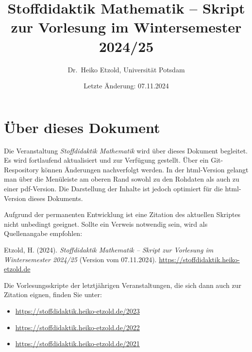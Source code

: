 \documentclass[
]{scrbook}
\title{Stoffdidaktik Mathematik -- Skript zur Vorlesung im Wintersemester 2024/25}
\author{Dr.~Heiko Etzold, Universität Potsdam}
\date{Letzte Änderung: 07.11.2024}
\makeatletter
\providecommand{\tightlist}{%
  \setlength{\itemsep}{0pt}\setlength{\parskip}{0pt}}
\renewenvironment{quote}{
  \list{}{
	\leftmargin0.2cm   %
    \rightmargin\leftmargin
      	\def\FrameCommand
    {%
        {\color{quoteColor}\vrule width 2pt}%
        \hspace{0pt}%
    }%
    \MakeFramed{\advance \hsize -\width \FrameRestore}    \color{quoteColor}
    }
  \item\relax
}
{\endlist\color{black}\endMakeFramed}
\def\renewtheorem#1{%
  \expandafter\let\csname#1\endcsname\relax
  \expandafter\let\csname c@#1\endcsname\relax
  \gdef\renewtheorem@envname{#1}
  \renewtheorem@secpar
}
\def\renewtheorem@secpar{\@ifnextchar[{\renewtheorem@numberedlike}{\renewtheorem@nonumberedlike}}
\def\renewtheorem@numberedlike[#1]#2{\newtheorem{\renewtheorem@envname}[#1]{#2}}
\def\renewtheorem@nonumberedlike#1{
\def\renewtheorem@caption{#1}
\edef\renewtheorem@nowithin{\noexpand\newtheorem{\renewtheorem@envname}{\renewtheorem@caption}}
\renewtheorem@thirdpar
}
\def\renewtheorem@thirdpar{\@ifnextchar[{\renewtheorem@within}{\renewtheorem@nowithin}}
\def\renewtheorem@within[#1]{\renewtheorem@nowithin[#1]}
\theoremstyle{definition}
\theoremstyle{definition}
\theoremstyle{definition}
\theoremstyle{definition}
\theoremstyle{remark}
\makeatother
\begin{document}
\maketitle

%

{
\hypersetup{linkcolor=}
\setcounter{tocdepth}{1}
\tableofcontents
}
\chapter*{Über dieses Dokument}\label{uxfcber-dieses-dokument}

Die Veranstaltung \emph{Stoffdidaktik Mathematik} wird über dieses Dokument begleitet. Es wird fortlaufend aktualisiert und zur Verfügung gestellt. Über ein Git-Respository können Änderungen nachverfolgt werden.
In der html-Version gelangt man über die Menüleiste am oberen Rand sowohl zu den Rohdaten als auch zu einer pdf-Version. Die Darstellung der Inhalte ist jedoch optimiert für die html-Version dieses Dokuments.

Aufgrund der permanenten Entwicklung ist eine Zitation des aktuellen Skriptes nicht unbedingt geeignet. Sollte ein Verweis notwendig sein, wird als Quellenangabe empfohlen:

\begin{quote}
Etzold, H. (2024). \emph{Stoffdidaktik Mathematik -- Skript zur Vorlesung im Wintersemester 2024/25} (Version vom 07.11.2024). \url{https://stoffdidaktik.heiko-etzold.de}
\end{quote}

Die Vorlesungsskripte der letztjährigen Veranstaltungen, die sich dann auch zur Zitation eignen, finden Sie unter:

\begin{itemize}
\tightlist
\item
  \url{https://stoffdidaktik.heiko-etzold.de/2023}
\item
  \url{https://stoffdidaktik.heiko-etzold.de/2022}
\item
  \url{https://stoffdidaktik.heiko-etzold.de/2021}
\end{itemize}
\end{document}
